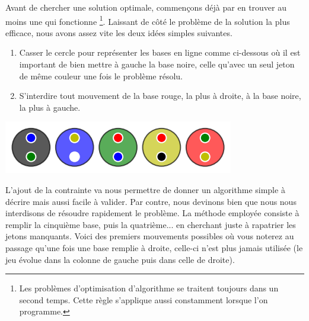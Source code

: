 Avant de chercher une solution optimale, commençons déjà par en trouver au moins une qui fonctionne
\footnote{
	Les problèmes d'optimisation d'algorithme se traitent toujours dans un second temps. Cette règle s'applique aussi constamment lorsque l'on programme.
}.
Laissant de côté le problème de la solution la plus efficace, nous avons assez vite les deux idées simples suivantes.

\begin{enumerate}
	\item Casser le cercle pour représenter les bases en ligne comme ci-dessous où il est important de bien mettre à gauche la base noire, celle qu'avec un seul jeton de même couleur une fois le problème résolu.

	\item S'interdire tout mouvement de la base rouge, la plus à droite, à la base noire, la plus à gauche.
\end{enumerate}

\vspace{-0.4em}
\begin{center}   %
	\includegraphics[scale= 0.45]{content/algo_selection/example/000.png}
\end{center}
\vspace{-0.8em}


L'ajout de la contrainte va nous permettre de donner un algorithme simple à décrire mais aussi facile à valider. Par contre, nous devinons bien que nous nous interdisons de résoudre rapidement le problème.
La méthode employée consiste à remplir la cinquième base, puis la quatrième... en cherchant juste à rapatrier les jetons manquants. Voici des premiers mouvements possibles où vous noterez au passage qu'une fois une base remplie à droite, celle-ci n'est plus jamais utilisée (le jeu évolue dans la colonne de gauche puis dans celle de droite).


\medskip

